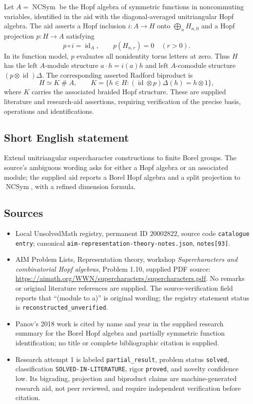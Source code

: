 \documentclass[11pt]{article}
\begin{document}
Let $A=\operatorname{NCSym}$ be the Hopf algebra of symmetric functions in noncommuting variables, identified in the aid with the diagonal-averaged unitriangular Hopf algebra. The aid asserts a Hopf inclusion $i:A\longrightarrow H$ onto $\bigoplus_n H_{n,0}$ and a Hopf projection $p:H\longrightarrow A$ satisfying
\[
p\circ i=\operatorname{id}_A,\qquad p(H_{n,r})=0\quad(r>0).
\]
In its function model, $p$ evaluates all nonidentity torus letters at zero. Thus $H$ has the left $A$-module structure $a\cdot h=i(a)h$ and left $A$-comodule structure $(p\otimes\operatorname{id})\Delta$. The corresponding asserted Radford biproduct is
\[
H\simeq K\mathbin{\#} A,\qquad
K=\{h\in H:(\operatorname{id}\otimes p)\Delta(h)=h\otimes1\},
\]
where $K$ carries the associated braided Hopf structure. These are supplied literature and research-aid assertions, requiring verification of the precise basis, operations and identifications.
\subsection{Short English statement}
Extend unitriangular supercharacter constructions to finite Borel groups. The source's ambiguous wording asks for either a Hopf algebra or an associated module; the supplied aid reports a Borel Hopf algebra and a split projection to $\operatorname{NCSym}$, with a refined dimension formula.
\subsection{Sources}
\begin{itemize}
\item Local UnsolvedMath registry, permanent ID $20002822$, source code \texttt{catalogue entry}; canonical \texttt{aim-representation-theory-notes.json}, \texttt{notes[93]}.
\item AIM Problem Lists, Representation theory, workshop \emph{Supercharacters and combinatorial Hopf algebras}, Problem 1.10, supplied PDF source: \url{https://aimath.org/WWN/supercharacters/supercharacters.pdf}. No remarks or original literature references are supplied. The source-verification field reports that ``(module to a)'' is original wording; the registry statement status is \texttt{reconstructed\_unverified}.
\item Panov's 2018 work is cited by name and year in the supplied research summary for the Borel Hopf algebra and partially symmetric function identification; no title or complete bibliographic citation is supplied.
\item Research attempt 1 is labeled \texttt{partial\_result}, problem status \texttt{solved}, classification \texttt{SOLVED-IN-LITERATURE}, rigor \texttt{proved}, and novelty confidence low. Its bigrading, projection and biproduct claims are machine-generated research aid, not peer reviewed, and require independent verification before citation.
\end{itemize}
\end{document}
